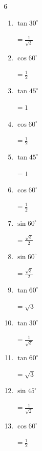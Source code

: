 \begin{multicols}{6}
\begin{enumerate}
        $\displaystyle =\sqrt{3}$

  \item $\displaystyle \tan{30^\circ}$

        $\displaystyle =\frac{1}{\sqrt{3}}$

  \item $\displaystyle \cos{60^\circ}$

        $\displaystyle =\frac{1}{2}$

  \item $\displaystyle \tan{45^\circ}$

        $\displaystyle =1$

  \item $\displaystyle \cos{60^\circ}$

        $\displaystyle =\frac{1}{2}$

  \item $\displaystyle \tan{45^\circ}$

        $\displaystyle =1$

  \item $\displaystyle \cos{60^\circ}$

        $\displaystyle =\frac{1}{2}$

  \item $\displaystyle \sin{60^\circ}$

        $\displaystyle =\frac{\sqrt{3}}{2}$

  \item $\displaystyle \sin{60^\circ}$

        $\displaystyle =\frac{\sqrt{3}}{2}$

  \item $\displaystyle \tan{60^\circ}$

        $\displaystyle =\sqrt{3}$

  \item $\displaystyle \tan{30^\circ}$

        $\displaystyle =\frac{1}{\sqrt{3}}$

  \item $\displaystyle \tan{60^\circ}$

        $\displaystyle =\sqrt{3}$

  \item $\displaystyle \sin{45^\circ}$

        $\displaystyle =\frac{1}{\sqrt{2}}$

  \item $\displaystyle \cos{60^\circ}$

        $\displaystyle =\frac{1}{2}$


\end{enumerate}
\end{multicols}
